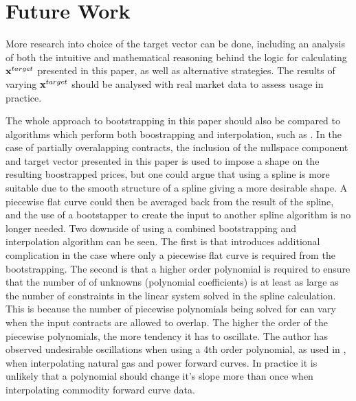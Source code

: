\documentclass{article}
\begin{document}
\section{Future Work}
More research into choice of the target vector can be done, including an analysis of both
the intuitive and mathematical reasoning behind the logic for calculating $\mathbf{x}^{target}$ 
presented in this paper, as well as alternative strategies. The results of varying  
$\mathbf{x}^{target}$ should be analysed with real market data to assess usage in practice.

\bigskip

The whole approach to bootstrapping in this paper should also be compared to algorithms
which perform both boostrapping and interpolation, such as \cite{Benth}. In the case of
partially overalapping contracts, the inclusion of the nullspace component and target
vector presented in this paper is used to impose a shape on the resulting boostrapped
prices, but one could argue that using a spline is more suitable due to the smooth 
structure of a spline giving a more desirable shape. A piecewise flat curve could
then be averaged back from the result of the spline, and the use of a bootstapper
to create the input to another spline algorithm is no longer needed. Two downside of
using a combined bootstrapping and interpolation algorithm can be seen. The first
is that introduces additional complication in the case where only a piecewise flat
curve is required from the bootstrapping. The second is that a higher order polynomial
is required to ensure that the number of of unknowns (polynomial coefficients) is at
least as large as the number of constraints in the linear system solved in the spline
calculation. This is because the number of piecewise polynomials being solved for can 
vary when the input contracts are allowed to overlap. The higher the order of the
piecewise polynomials, the more tendency it has to oscillate.
The author has observed undesirable oscillations when using a 4th order polynomial,
as used in \cite{Benth}, when interpolating natural gas and power forward curves. 
In practice it is unlikely that a polynomial should change it's
slope more than once when interpolating commodity forward curve data.





\end{document}
